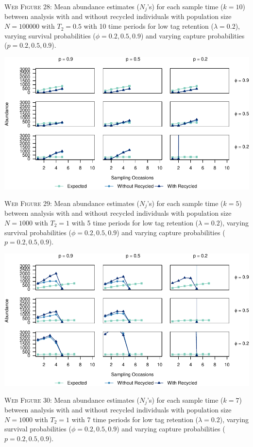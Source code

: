 \documentclass[]{article}
\begin{document}
\textsc{Web Figure 28:} Mean abundance estimates (\(N_j\)'s) for each
sample time (\(k=10\)) between analysis with and without recycled
individuals with population size \(N=100000\) with \(T_2=0.5\) with 10
time periods for low tag retention (\(\lambda=0.2\)), varying survival
probabilities (\(\phi=0.2,0.5,0.9\)) and varying capture probabilities
(\(p=0.2,0.5,0.9\)).

\newpage

\includegraphics{Appendix_files/figure-latex/29_abundance_L_GJSTL5-1.pdf}

\textsc{Web Figure 29:} Mean abundance estimates (\(N_j\)'s) for each
sample time (\(k=5\)) between analysis with and without recycled
individuals with population size \(N=1000\) with \(T_2=1\) with 5 time
periods for low tag retention (\(\lambda=0.2\)), varying survival
probabilities (\(\phi=0.2,0.5,0.9\)) and varying capture probabilities
(\(p=0.2,0.5,0.9\)).

\includegraphics{Appendix_files/figure-latex/30_abundance_L_GJSTL6-1.pdf}

\textsc{Web Figure 30:} Mean abundance estimates (\(N_j\)'s) for each
sample time (\(k=7\)) between analysis with and without recycled
individuals with population size \(N=1000\) with \(T_2=1\) with 7 time
periods for low tag retention (\(\lambda=0.2\)), varying survival
probabilities (\(\phi=0.2,0.5,0.9\)) and varying capture probabilities
(\(p=0.2,0.5,0.9\)).
\end{document}
